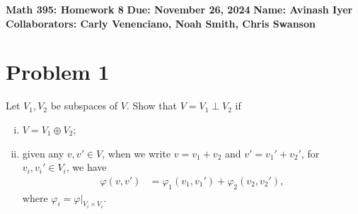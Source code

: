 \documentclass[10pt]{mypackage}
\begin{document}
\RaggedRight
\begin{center}
  \textbf{Math 395: Homework 8}\break
  \textbf{Due: November 26, 2024}\break
  \textbf{Name: Avinash Iyer}\break
  \textbf{Collaborators: Carly Venenciano, Noah Smith, Chris Swanson}
\end{center}
\section{Problem 1}%
\begin{problem}
  Let $V_1,V_2$ be subspaces of $V$. Show that $V = V_1\perp V_2$ if
  \begin{enumerate}[(i)]
    \item $V = V_1\oplus V_2$;
    \item given any $v,v'\in V$, when we write $v = v_1 + v_2$ and $v' = v_1' + v_2'$, for $v_i,v_i'\in V_i$, we have
      \begin{align*}
        \varphi\left(v,v'\right) &= \varphi_1\left(v_1,v_1'\right) + \varphi_2\left(v_2,v_2'\right),
      \end{align*}
      where $\varphi_i = \varphi|_{V_i\times V_i}$.
  \end{enumerate}
\end{problem}
\end{document}
